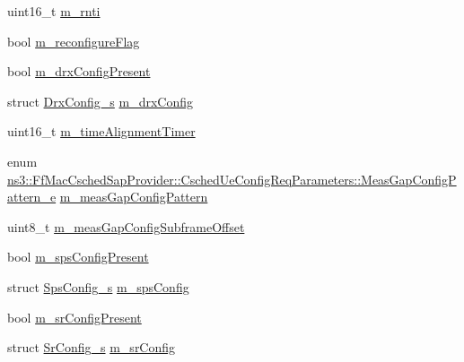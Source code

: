 \begin{DoxyCompactItemize}
\item 
uint16\+\_\+t \hyperlink{structns3_1_1FfMacCschedSapProvider_1_1CschedUeConfigReqParameters_ad14c219988b02fe57a1e99e5e004b649}{m\+\_\+rnti}
\item 
bool \hyperlink{structns3_1_1FfMacCschedSapProvider_1_1CschedUeConfigReqParameters_a42efe262905fd92828c77cd1ecb37740}{m\+\_\+reconfigure\+Flag}
\item 
bool \hyperlink{structns3_1_1FfMacCschedSapProvider_1_1CschedUeConfigReqParameters_ae9f9033823b75f8278c9a6cf7af43a98}{m\+\_\+drx\+Config\+Present}
\item 
struct \hyperlink{structns3_1_1DrxConfig__s}{Drx\+Config\+\_\+s} \hyperlink{structns3_1_1FfMacCschedSapProvider_1_1CschedUeConfigReqParameters_a30c88f8da55c7c2f7cae8004d58eb0b2}{m\+\_\+drx\+Config}
\item 
uint16\+\_\+t \hyperlink{structns3_1_1FfMacCschedSapProvider_1_1CschedUeConfigReqParameters_aa7791bc11b5456cd63ea11c2105454e0}{m\+\_\+time\+Alignment\+Timer}
\item 
enum \hyperlink{structns3_1_1FfMacCschedSapProvider_1_1CschedUeConfigReqParameters_a7db414671a1a529a0425a51d50dd970a}{ns3\+::\+Ff\+Mac\+Csched\+Sap\+Provider\+::\+Csched\+Ue\+Config\+Req\+Parameters\+::\+Meas\+Gap\+Config\+Pattern\+\_\+e} \hyperlink{structns3_1_1FfMacCschedSapProvider_1_1CschedUeConfigReqParameters_aaee4fcf3e09c9b3f92c3307d21625265}{m\+\_\+meas\+Gap\+Config\+Pattern}
\item 
uint8\+\_\+t \hyperlink{structns3_1_1FfMacCschedSapProvider_1_1CschedUeConfigReqParameters_a8d723ec47a439de4e9494b79f3a6fa32}{m\+\_\+meas\+Gap\+Config\+Subframe\+Offset}
\item 
bool \hyperlink{structns3_1_1FfMacCschedSapProvider_1_1CschedUeConfigReqParameters_aaccbc99a8a73641c5b4486214b1e2810}{m\+\_\+sps\+Config\+Present}
\item 
struct \hyperlink{structns3_1_1SpsConfig__s}{Sps\+Config\+\_\+s} \hyperlink{structns3_1_1FfMacCschedSapProvider_1_1CschedUeConfigReqParameters_aac69dc4d98bfc65285d425ed7bbf5f9f}{m\+\_\+sps\+Config}
\item 
bool \hyperlink{structns3_1_1FfMacCschedSapProvider_1_1CschedUeConfigReqParameters_afd63642b0588f60928968382b6708e31}{m\+\_\+sr\+Config\+Present}
\item 
struct \hyperlink{structns3_1_1SrConfig__s}{Sr\+Config\+\_\+s} \hyperlink{structns3_1_1FfMacCschedSapProvider_1_1CschedUeConfigReqParameters_aa4e04c05d14923970a52cfc2f5b784e4}{m\+\_\+sr\+Config}

\end{DoxyCompactItemize}
